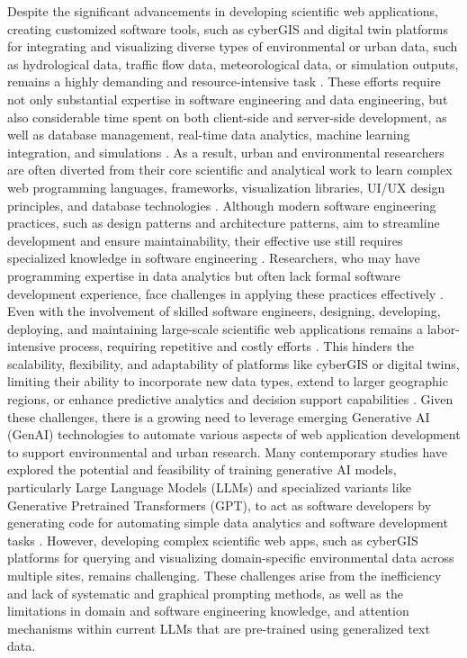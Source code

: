 Despite the significant advancements in developing scientific web applications, creating customized software tools, such as cyberGIS and digital twin platforms for integrating and visualizing diverse types of environmental or urban data, such as hydrological data, traffic flow data, meteorological data, or simulation outputs, remains a highly demanding and resource-intensive task \citep{shanjun2024design, siddiqui2024digital, lei2023challenges}. These efforts require not only substantial expertise in software engineering and data engineering, but also considerable time spent on both client-side and server-side development, as well as database management, real-time data analytics, machine learning integration, and simulations \citep{ikegwu2022big}. As a result, urban and environmental researchers are often diverted from their core scientific and analytical work to learn complex web programming languages, frameworks, visualization libraries, UI/UX design principles, and database technologies \citep{li2022bibliometric}. Although modern software engineering practices, such as design patterns and architecture patterns, aim to streamline development and ensure maintainability, their effective use still requires specialized knowledge in software engineering \citep{fayad2015software}. Researchers, who may have programming expertise in data analytics but often lack formal software development experience, face challenges in applying these practices effectively \citep{kim2017data}. Even with the involvement of skilled software engineers, designing, developing, deploying, and maintaining large-scale scientific web applications remains a labor-intensive process, requiring repetitive and costly efforts \citep{shah2024optimizing, mcbreen2002software}. This hinders the scalability, flexibility, and adaptability of platforms like cyberGIS or digital twins, limiting their ability to incorporate new data types, extend to larger geographic regions, or enhance predictive analytics and decision support capabilities \citep{liu2015cybergis, lei2023challenges}. Given these challenges, there is a growing need to leverage emerging Generative AI (GenAI) technologies to automate various aspects of web application development to support environmental and urban research. Many contemporary studies have explored the potential and feasibility of training generative AI models, particularly Large Language Models (LLMs) and specialized variants like Generative Pretrained Transformers (GPT), to act as software developers by generating code for automating simple data analytics and software development tasks \citep{liang2024can, liukko2024chatgpt}. However, developing complex scientific web apps, such as cyberGIS platforms for querying and visualizing domain-specific environmental data across multiple sites, remains challenging. These challenges arise from the inefficiency and lack of systematic and graphical prompting methods, as well as the limitations in domain and software engineering knowledge, and attention mechanisms within current LLMs that are pre-trained using generalized text data.